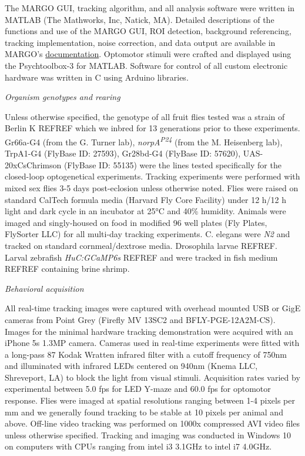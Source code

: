 \documentclass[10pt]{article}
\begin{document}
\begin{multicols}{2}
The MARGO GUI, tracking algorithm, and all analysis software were written in MATLAB (The Mathworks, Inc, Natick, MA). Detailed descriptions of the functions and use of the MARGO GUI, ROI detection, background referencing, tracking implementation, noise correction, and data output are available in MARGO's \href{https://github.com/de-Bivort-Lab/margo/wiki}{documentation}. Optomotor stimuli were crafted and displayed using the Psychtoolbox-3 for MATLAB. Software for control of all custom electronic hardware was written in C using Arduino libraries.

\vspace*{0.5cm}
\noindent\textit{Organism genotypes and rearing}
\vspace*{0.3cm}

Unless otherwise specified, the genotype of all fruit flies tested was a strain of Berlin K REFREF which we inbred for 13 generations prior to these experiments. Gr66a-G4 (from the G. Turner lab), \textit{norpA\textsuperscript{P24}} (from the M. Heisenberg lab), TrpA1-G4 (FlyBase ID: 27593), Gr28bd-G4 (FlyBase ID: 57620), UAS-20xCsChrimson (FlyBase ID: 55135) were the lines tested specifically for the closed-loop optogenetical experiments. Tracking experiments were performed with mixed sex flies 3-5 days post-eclosion unless otherwise noted. Flies were raised on standard CalTech formula media (Harvard Fly Core Facility) under 12 h/12 h light and dark cycle in an incubator at 25°C and 40\% humidity. Animals were imaged and singly-housed on food in modified 96 well plates (Fly Plates, FlySorter LLC) for all multi-day tracking experiments. C. elegans were \textit{N2} and tracked on standard cornmeal/dextrose media. Drosophila larvae REFREF. Larval zebrafish \textit{HuC:GCaMP6s} REFREF and were tracked in fish medium REFREF containing brine shrimp.

\vspace*{0.5cm}
\noindent\textit{Behavioral acquisition}
\vspace*{0.3cm}

All real-time tracking images were captured with overhead mounted USB or GigE cameras from Point Grey (Firefly MV 13SC2 and BFLY-PGE-12A2M-CS). Images for the minimal hardware tracking demonstration were acquired with an iPhone 5s 1.3MP camera. Cameras used in real-time experiments were fitted with a long-pass 87 Kodak Wratten infrared filter with a cutoff frequency of 750nm and illuminated with infrared LEDs centered on 940nm (Knema LLC, Shreveport, LA) to block the light from visual stimuli. Acquisition rates varied by experimental between 5.0 fps for LED Y-maze and 60.0 fps for optomotor response. Flies were imaged at spatial resolutions ranging between 1-4 pixels per mm and we generally found tracking to be stable at 10 pixels per animal and above. Off-line video tracking was performed on 1000x compressed AVI video files unless otherwise specified. Tracking and imaging was conducted in Windows 10 on computers with CPUs ranging from intel i3 3.1GHz to intel i7 4.0GHz. 


\end{multicols}
\end{document}
